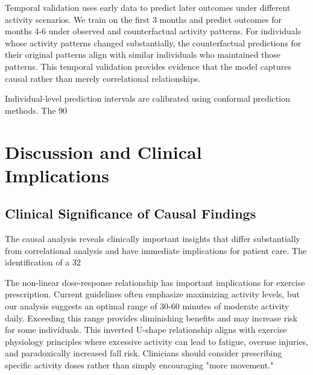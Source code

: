 \documentclass[journal]{IEEEtran}
\begin{document}
Temporal validation uses early data to predict later outcomes under different activity scenarios. We train on the first 3 months and predict outcomes for months 4-6 under observed and counterfactual activity patterns. For individuals whose activity patterns changed substantially, the counterfactual predictions for their original patterns align with similar individuals who maintained those patterns. This temporal validation provides evidence that the model captures causal rather than merely correlational relationships.

Individual-level prediction intervals are calibrated using conformal prediction methods. The 90%

\section{Discussion and Clinical Implications}

\subsection{Clinical Significance of Causal Findings}

The causal analysis reveals clinically important insights that differ substantially from correlational analysis and have immediate implications for patient care. The identification of a 32%

The non-linear dose-response relationship has important implications for exercise prescription. Current guidelines often emphasize maximizing activity levels, but our analysis suggests an optimal range of 30-60 minutes of moderate activity daily. Exceeding this range provides diminishing benefits and may increase risk for some individuals. This inverted U-shape relationship aligns with exercise physiology principles where excessive activity can lead to fatigue, overuse injuries, and paradoxically increased fall risk. Clinicians should consider prescribing specific activity doses rather than simply encouraging "more movement."
\end{document}
